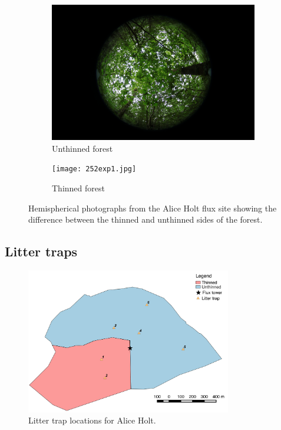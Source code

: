 \documentclass[11pt]{article}
\begin{document}
\begin{figure}[ht]
\centering
\begin{subfigure}{.5\textwidth}
  \centering
  \includegraphics[width=.9\linewidth]{043exp2.jpg}
  \caption{Unthinned forest}
  \label{fig:sub1}
\end{subfigure}%
\begin{subfigure}{.5\textwidth}
  \centering
  \texttt{[image: 252exp1.jpg]}
  \caption{Thinned forest}
  \label{fig:sub2}
\end{subfigure}
\caption{Hemispherical photographs from the Alice Holt flux site showing the difference between the thinned and unthinned sides of the forest.}
\label{fig:hemiphotos}
\end{figure}

\subsection{Litter traps}

\begin{figure}[ht]
    \centering
    \includegraphics[width=0.8\textwidth]{litter_trap.pdf}
    \caption{Litter trap locations for Alice Holt.} \label{fig:lit_traps}
\end{figure}
\end{document}
